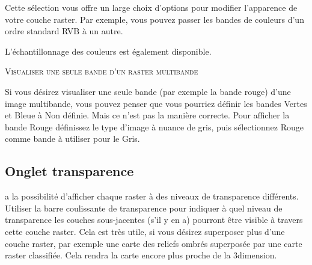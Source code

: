 
Cette sélection vous offre un large choix d'options pour modifier l'apparence de votre couche raster. Par exemple, vous pouvez passer les bandes de couleurs d'un ordre standard RVB à un autre.

L'échantillonnage des couleurs est également disponible.

\begin{Tip}\caption{\textsc{Visualiser une seule bande d'un raster multibande}}
Si vous désirez visualiser une seule bande (par exemple la bande rouge)
d'une image multibande, vous pouvez penser que vous pourriez définir les bandes Vertes et Bleue à Non définie. Mais ce n'est pas la manière correcte. Pour afficher la bande Rouge définissez le type d'image à nuance de gris, puis sélectionnez Rouge comme bande à utiliser pour le Gris.
\end{Tip} 

\subsection{Onglet transparence} \label{rastertab:transparency}

\qg a la possibilité d'afficher chaque raster à des niveaux de transparence
différents. Utiliser la barre coulissante de transparence pour indiquer à quel niveau de transparence les couches sous-jacentes (s'il y en a) pourront être visible à travers cette couche raster. Cela est très utile, si vous désirez superposer plus d'une couche raster, par exemple une carte des reliefs ombrés superposée par une carte raster classifiée. Cela rendra la carte encore plus proche de la 3\ieme dimension.

